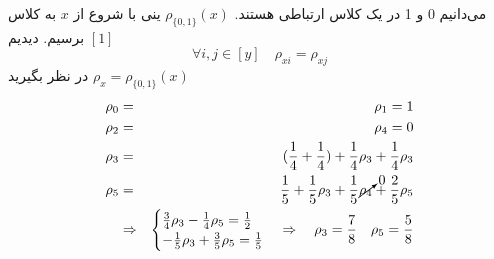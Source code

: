 \documentclass[11pt, a4, twoside]{article}
\begin{document}
\begin{problem}
\begin{itemize}
		{
			\color{blue} می‌دانیم 0 و 1 در یک کلاس ارتباطی هستند. \(\rho_{\{0,1\} } (x)\) ینی با شروع از \(x\) به کلاس \([1]\) برسیم. دیدیم \[ \forall i , j \in [y] \quad \rho_{xi} = \rho_{xj}\]
			\(\rho_x = \rho_{\{0,1\}}(x)\) در نظر بگیرید
			\begin{eqnarray*}
				\rho_0 &=& \rho_1 = 1 \\
				\rho_2 &=& \rho_4 = 0 \\
				\rho_3 &=& (\frac{1}{4} + \frac{1}{4}) + \frac{1}{4}\rho_3 + \frac{1}{4}\rho_3  \\
				\rho_5 &=& \frac{1}{5} + \frac{1}{5}\rho_3 + \frac{1}{5}\cancelto{0}{\rho_4} + \frac{2}{5}\rho_5 \\
				&\Rightarrow& 
				\begin{cases}
					\frac{3}{4}\rho_3 - \frac{1}{4}\rho_5  = \frac{1}{2} \\
					- \frac{1}{5}\rho_3 +\frac{3}{5}\rho_5 = \frac{1}{5}
				\end{cases} 
				\Rightarrow \quad \rho_3 = \frac{7}{8} \quad \rho_5 = \frac{5}{8}
			\end{eqnarray*} 
		} 
		\end{itemize}
	\end{problem}
\end{document}
